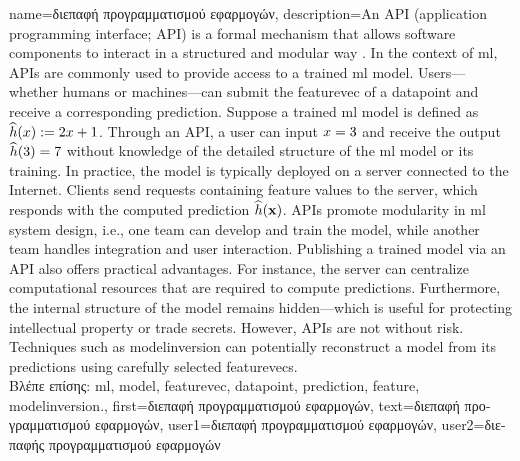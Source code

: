 {name={\foreignlanguage{greek}{διεπαφή προγραμματισμού εφαρμογών}},
		description={An 
			API (application programming interface; API) is a formal mechanism that 
			allows software components to interact in a structured and modular way \cite{RestfulBook2013}.
			In the context of \gls{ml}, APIs are commonly used to provide access to a trained \gls{ml} \gls{model}. 
			Users—whether humans or machines—can submit the \gls{featurevec} of a \gls{datapoint} and receive 
			a corresponding \gls{prediction}. Suppose a trained \gls{ml} \gls{model} is defined 
			as $\widehat{h}(x) := 2 x + 1$. Through an API, a user 
			can input $x = 3$ and receive the output $\widehat{h}(3) = 7$ 
			without knowledge of the detailed structure of the \gls{ml} \gls{model} or its training. 
			In practice, the \gls{model} is typically deployed on a server connected to the Internet. 
			Clients send requests containing \gls{feature} values to the server, which responds with 
			the computed \gls{prediction} $\widehat{h}({\bf x})$. APIs promote modularity 
			in \gls{ml} system design, i.e., one team can develop and train the \gls{model}, while another team
			handles integration and user interaction. Publishing a trained \gls{model} via an API also 
			offers practical advantages. For instance, the server can centralize computational resources that 
			are required to compute \gls{prediction}s. Furthermore, the internal structure of the \gls{model} remains 
			hidden—which is useful for protecting intellectual property or trade secrets. 
			However, APIs are not without \gls{risk}. Techniques such as \gls{modelinversion} can potentially reconstruct a 
			\gls{model} from its \gls{prediction}s using carefully selected \gls{featurevec}s.\\
			\foreignlanguage{greek}{Βλέπε επίσης:} \gls{ml}, \gls{model}, \gls{featurevec}, \gls{datapoint}, \gls{prediction}, \gls{feature}, \gls{modelinversion}.},
		first={\foreignlanguage{greek}{διεπαφή προγραμματισμού εφαρμογών}},
		text={\foreignlanguage{greek}{διεπαφή προγραμματισμού εφαρμογών}},
		user1={\foreignlanguage{greek}{διεπαφή προγραμματισμού εφαρμογών}}, %
		user2={\foreignlanguage{greek}{διεπαφής προγραμματισμού εφαρμογών}} %
}

